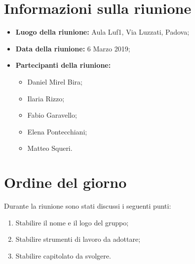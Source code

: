 \documentclass[a4paper, oneside, openany, dvipsnames, table]{article}
\begin{document}
\tableofcontents
\newpage
\section{Informazioni sulla riunione}
\begin{itemize}
	\item \textbf{Luogo della riunione:} Aula Luf1, Via Luzzati, Padova;
	\item \textbf{Data della riunione:} 6 Marzo 2019;
	
	\item \textbf{Partecipanti della riunione:}
		\begin{itemize}
			\item Daniel Mirel Bira;
			\item Ilaria Rizzo;
			\item Fabio Garavello;
			\item Elena Pontecchiani;
			\item Matteo Squeri.
		\end{itemize}
\end{itemize}


	
	
	
\newpage
\section{Ordine del giorno}
Durante la riunione sono stati discussi i seguenti punti:
\begin{enumerate}
	\item Stabilire il nome e il logo del gruppo;
	\item Stabilire strumenti di lavoro da adottare;
	\item Stabilire capitolato da svolgere.
		
\end{enumerate}
	

\newpage
\end{document}
